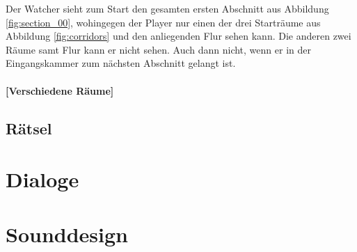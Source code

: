 Der Watcher sieht zum Start den gesamten ersten Abschnitt aus Abbildung \ref{fig:section_00}, wohingegen der Player nur einen der drei Starträume aus Abbildung \ref{fig:corridors} und den anliegenden Flur sehen kann. Die anderen zwei Räume samt Flur kann er nicht sehen. Auch dann nicht, wenn er in der Eingangskammer zum nächsten Abschnitt gelangt ist.

\paragraph{[Verschiedene Räume]}

\subsection{Rätsel}

\section{Dialoge}

\section{Sounddesign}









